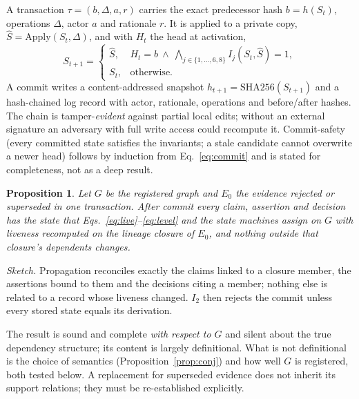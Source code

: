\documentclass[journal]{IEEEtran}
\newtheorem{proposition}{Proposition}
\begin{document}
A transaction $\tau=(b,\Delta,a,r)$ carries the exact predecessor hash $b=h(S_t)$, operations $\Delta$, actor $a$ and rationale $r$. It is applied to a private copy, $\widehat S=\mathrm{Apply}(S_t,\Delta)$, and with $H_t$ the head at activation,
\begin{equation}
S_{t+1}=\begin{cases}\widehat S, & H_t=b\ \land\ \bigwedge_{j\in\{1,\dots,6,8\}} I_j(S_t,\widehat S)=1,\\ S_t, & \text{otherwise.}\end{cases}
\label{eq:commit}
\end{equation}
A commit writes a content-addressed snapshot $h_{t+1}=\mathrm{SHA256}(S_{t+1})$ and a hash-chained log record with actor, rationale, operations and before/after hashes. The chain is tamper-\emph{evident} against partial local edits; without an external signature an adversary with full write access could recompute it. Commit-safety (every committed state satisfies the invariants; a stale candidate cannot overwrite a newer head) follows by induction from Eq.~\eqref{eq:commit} and is stated for completeness, not as a deep result.

\begin{proposition}\label{prop:prop}
Let $G$ be the registered graph and $E_0$ the evidence rejected or superseded in one transaction. After commit every claim, assertion and decision has the state that Eqs.~\eqref{eq:live}--\eqref{eq:level} and the state machines assign on $G$ with liveness recomputed on the lineage closure of $E_0$, and nothing outside that closure's dependents changes.
\end{proposition}
\emph{Sketch.} Propagation reconciles exactly the claims linked to a closure member, the assertions bound to them and the decisions citing a member; nothing else is related to a record whose liveness changed. $I_2$ then rejects the commit unless every stored state equals its derivation. \qedhere

The result is sound and complete \emph{with respect to $G$} and silent about the true dependency structure; its content is largely definitional. What is not definitional is the choice of semantics (Proposition~\ref{prop:conj}) and how well $G$ is registered, both tested below. A replacement for superseded evidence does not inherit its support relations; they must be re-established explicitly.
\end{document}
